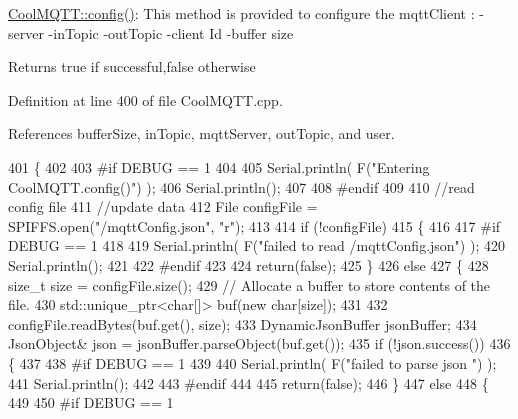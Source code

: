 \hyperlink{classCoolMQTT_a6571671781a505feca9a8a56e256c6bc}{Cool\+M\+Q\+T\+T\+::config()}\+: This method is provided to configure the mqtt\+Client \+: -\/server -\/in\+Topic -\/out\+Topic -\/client Id -\/buffer size

\begin{DoxyReturn}{Returns}
true if successful,false otherwise 
\end{DoxyReturn}


Definition at line 400 of file Cool\+M\+Q\+T\+T.\+cpp.



References buffer\+Size, in\+Topic, mqtt\+Server, out\+Topic, and user.


\begin{DoxyCode}
401 \{
402 
403 \textcolor{preprocessor}{#if DEBUG == 1 }
404 
405     Serial.println( F(\textcolor{stringliteral}{"Entering CoolMQTT.config()"}) );
406     Serial.println();
407 
408 \textcolor{preprocessor}{#endif}
409 
410     \textcolor{comment}{//read config file}
411     \textcolor{comment}{//update data}
412     File configFile = SPIFFS.open(\textcolor{stringliteral}{"/mqttConfig.json"}, \textcolor{stringliteral}{"r"});
413 
414     \textcolor{keywordflow}{if} (!configFile) 
415     \{
416     
417 \textcolor{preprocessor}{    #if DEBUG == 1 }
418 
419         Serial.println( F(\textcolor{stringliteral}{"failed to read /mqttConfig.json"}) );
420         Serial.println();
421 
422 \textcolor{preprocessor}{    #endif}
423 
424         \textcolor{keywordflow}{return}(\textcolor{keyword}{false});
425     \}
426     \textcolor{keywordflow}{else}
427     \{
428         \textcolor{keywordtype}{size\_t} size = configFile.size();
429         \textcolor{comment}{// Allocate a buffer to store contents of the file.}
430         std::unique\_ptr<char[]> buf(\textcolor{keyword}{new} \textcolor{keywordtype}{char}[size]);
431 
432         configFile.readBytes(buf.get(), size);
433         DynamicJsonBuffer jsonBuffer;
434         JsonObject& json = jsonBuffer.parseObject(buf.get());
435         \textcolor{keywordflow}{if} (!json.success()) 
436         \{
437         
438 \textcolor{preprocessor}{        #if DEBUG == 1 }
439 
440             Serial.println( F(\textcolor{stringliteral}{"failed to parse json "}) );
441             Serial.println();
442         
443 \textcolor{preprocessor}{        #endif}
444             
445             \textcolor{keywordflow}{return}(\textcolor{keyword}{false});
446         \} 
447         \textcolor{keywordflow}{else}
448         \{
449         
450 \textcolor{preprocessor}{        #if DEBUG == 1 }

\end{DoxyCode}
